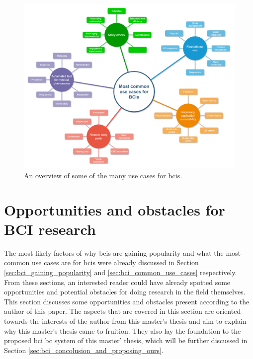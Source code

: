 \begin{figure}[ht]
    \centering
    \includegraphics[width=\linewidth]{../images/introduction/use_cases_overview.pdf}
    \captionsetup{width=0.7\linewidth}
    \captionsetup{justification=centering}
    \caption{An overview of some of the many use cases for \glspl{bci}.} 
    \label{fig:bci_use_cases_diagram}
\end{figure}



\section{Opportunities and obstacles for BCI research}
\label{sec:bci_opportunities_obstacles}

The most likely factors of why \glspl{bci} are gaining popularity and what the most common use cases are for \glspl{bci} were already discussed in Section \ref{sec:bci_gaining_popularity} and \ref{sec:bci_common_use_cases} respectively.
From these sections, an interested reader could have already spotted some opportunities and potential obstacles for doing research in the field themselves.
This section discusses some opportunities and obstacles present according to the author of this paper.
The aspects that are covered in this section are oriented towards the interests of the author from this master's thesis and aim to explain why this master's thesis came to fruition.
They also lay the foundation to the proposed \gls{bci} \gls{bc} system of this master' thesis, which will be further discussed in Section \ref{sec:bci_concolusion_and_proposing_ours}.



